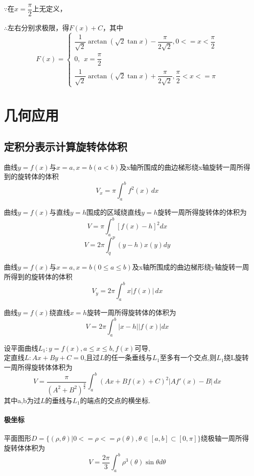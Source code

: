 \(\because\)在\(x = \dfrac{\pi}{2}\)上无定义，

\(\therefore\)左右分别求极限，得\(F(x) + C\)，其中
\[F(x) = \begin{cases}
    \dfrac{1}{\sqrt{2}}\arctan(\sqrt{2}\tan x) - \dfrac{\pi}{2\sqrt{2}}, 0 <= x < \dfrac{\pi}{2} \\ 
    0,\ \ x = \dfrac{\pi}{2} \\ 
    \dfrac{1}{\sqrt{2}}\arctan(\sqrt{2}\tan x) + \dfrac{\pi}{2\sqrt{2}}, \dfrac{\pi}{2} < x <= \pi
\end{cases}\]


\section{几何应用}

\subsection{定积分表示计算旋转体体积}

曲线\(y=f(x)\)与\(x=a,x=b(a < b)\)及x轴所围成的曲边梯形绕x轴旋转一周所得到的旋转体的体积
\begin{displaymath}
V_{x} = \pi \int_{a}^{b} f^{2}(x) \,dx
\end{displaymath}

曲线\(y = f(x)\)与直线\(y = h\)围成的区域绕直线\(y = h\)旋转一周所得旋转体的体积为\[V = \pi\int_a^b[f(x) - h]^2dx\]
\[V = 2\pi\int_q^p(y - h)x(y)dy\]

曲线\(y=f(x)\)与\(x=a,x=b(0 \leq a \leq b)\)及x轴所围成的曲边梯形绕y轴旋转一周所得到的旋转体的体积
\begin{displaymath}
V_{y} = 2\pi \int_{a}^{b} x \lvert f(x) \rvert \,dx
\end{displaymath}

曲线\(y = f(x)\)绕直线\(x = h\)旋转一周所得旋转体的体积为\[V = 2\pi\int_a^b|x - h||f(x)|dx\]

设平面曲线\(L_1 : y = f(x), a \leq x \leq b, f(x)\)可导, \\
定直线\(L : Ax + By + C = 0\),且过\(L\)的任一条垂线与\(L_1\)至多有一个交点,则\(L_1\)绕L旋转一周所得旋转体体积为
\begin{displaymath}
V = \frac{\pi}{(A^2 + B^2)^{\frac{3}{2}}}
\int_{a}^{b} (Ax + Bf(x) + C)^2 \lvert Af'(x) - B \rvert \,dx
\end{displaymath}
其中a,b为过\(L\)的垂线与\(L_1\)的端点的交点的横坐标.

\paragraph{极坐标}
平面图形\(D = \{(\rho, \theta) | 0 <= \rho <= \rho(\theta), \theta \in [a, b] \subset [0, \pi]\}\)绕极轴一周所得旋转体体积为\[V = \dfrac{2\pi}{3}\int_a^b\rho^3(\theta)\sin\theta d\theta\]


